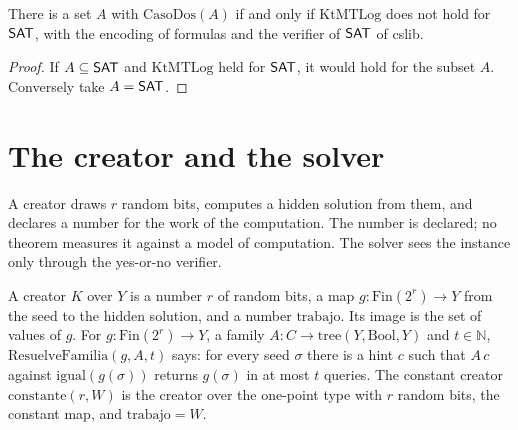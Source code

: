 \begin{theorem}
  \label{thm:information-case-two-iff}
  \leanok
  There is a set $A$ with $\mathrm{CasoDos}(A)$ if and only if $\mathrm{KtMTLog}$ does not hold for
  $\mathsf{SAT}$, with the encoding of formulas and the verifier of $\mathsf{SAT}$ of cslib.
  \own{}
\end{theorem}

\begin{proof}
  \leanok
  If $A \subseteq \mathsf{SAT}$ and $\mathrm{KtMTLog}$ held for $\mathsf{SAT}$, it would hold for the subset $A$.
  Conversely take $A = \mathsf{SAT}$.
\end{proof}

\section{The creator and the solver}
\label{sec:information-creator}

A creator draws $r$ random bits, computes a hidden solution from them, and declares a number for
the work of the computation. The number is declared; no theorem measures it against a model of
computation. The solver sees the instance only through the yes-or-no verifier.

\begin{definition}
  \label{def:information-creator}
  \leanok
  A creator $K$ over $Y$ is a number $r$ of random bits, a map $g : \mathrm{Fin}(2^r) \to Y$ from the
  seed to the hidden solution, and a number $\mathrm{trabajo}$. Its image is the set of values of
  $g$. For $g : \mathrm{Fin}(2^r) \to Y$, a family $A : C \to \text{tree}(Y, \mathrm{Bool}, Y)$ and
  $t \in \mathbb{N}$, $\mathrm{ResuelveFamilia}(g, A, t)$ says: for every seed $\sigma$ there is a
  hint $c$ such that $A\,c$ against $\mathrm{igual}(g(\sigma))$ returns $g(\sigma)$ in at most $t$
  queries. The constant creator $\mathrm{constante}(r, W)$ is the creator over the one-point type
  with $r$ random bits, the constant map, and $\mathrm{trabajo} = W$.
  \own{}
\end{definition}

